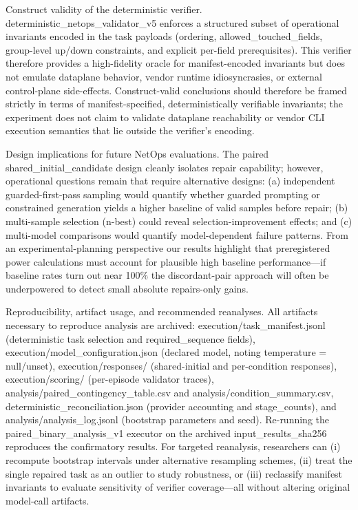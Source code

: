\documentclass[conference]{IEEEtran}
\begin{document}
Construct validity of the deterministic verifier. deterministic\_netops\_validator\_v5 enforces a structured subset of operational invariants encoded in the task payloads (ordering, allowed\_touched\_fields, group-level up/down constraints, and explicit per-field prerequisites). This verifier therefore provides a high-fidelity oracle for manifest-encoded invariants but does not emulate dataplane behavior, vendor runtime idiosyncrasies, or external control-plane side-effects. Construct-valid conclusions should therefore be framed strictly in terms of manifest-specified, deterministically verifiable invariants; the experiment does not claim to validate dataplane reachability or vendor CLI execution semantics that lie outside the verifier's encoding.

Design implications for future NetOps evaluations. The paired shared\_initial\_candidate design cleanly isolates repair capability; however, operational questions remain that require alternative designs: (a) independent guarded-first-pass sampling would quantify whether guarded prompting or constrained generation yields a higher baseline of valid samples before repair; (b) multi-sample selection (n-best) could reveal selection-improvement effects; and (c) multi-model comparisons would quantify model-dependent failure patterns. From an experimental-planning perspective our results highlight that preregistered power calculations must account for plausible high baseline performance---if baseline rates turn out near 100\% the discordant-pair approach will often be underpowered to detect small absolute repairs-only gains.

Reproducibility, artifact usage, and recommended reanalyses. All artifacts necessary to reproduce analysis are archived: execution/task\_manifest.jsonl (deterministic task selection and required\_sequence fields), execution/model\_configuration.json (declared model, noting temperature = null/unset), execution/responses/ (shared-initial and per-condition responses), execution/scoring/ (per-episode validator traces), analysis/paired\_contingency\_table.csv and analysis/condition\_summary.csv, deterministic\_reconciliation.json (provider accounting and stage\_counts), and analysis/analysis\_log.jsonl (bootstrap parameters and seed). Re-running the paired\_binary\_analysis\_v1 executor on the archived input\_results\_sha256 reproduces the confirmatory results. For targeted reanalysis, researchers can (i) recompute bootstrap intervals under alternative resampling schemes, (ii) treat the single repaired task as an outlier to study robustness, or (iii) reclassify manifest invariants to evaluate sensitivity of verifier coverage---all without altering original model-call artifacts.
\end{document}
